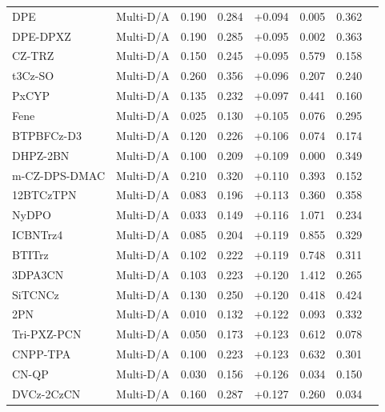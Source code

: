 \begin{longtable}{llcccccc}
DPE & Multi-D/A & 0.190 & 0.284 & +0.094 & 0.005 & 0.362 & \cite{doi101039C7TC02763J} \\
DPE-DPXZ & Multi-D/A & 0.190 & 0.285 & +0.095 & 0.002 & 0.363 & \cite{doi101039C7TC02763J} \\
CZ-TRZ & Multi-D/A & 0.150 & 0.245 & +0.095 & 0.579 & 0.158 & \cite{doi101016jorgel2020105783} \\
t3Cz-SO & Multi-D/A & 0.260 & 0.356 & +0.096 & 0.207 & 0.240 & \cite{doi101016jtet2020131869} \\
PxCYP & Multi-D/A & 0.135 & 0.232 & +0.097 & 0.441 & 0.160 & \cite{doi101016jdyepig2019107849} \\
Fene & Multi-D/A & 0.025 & 0.130 & +0.105 & 0.076 & 0.295 & \cite{doi101016jcclet202007041} \\
BTPBFCz-D3 & Multi-D/A & 0.120 & 0.226 & +0.106 & 0.074 & 0.174 & \cite{doi101016jcej2020127293} \\
DHPZ-2BN & Multi-D/A & 0.100 & 0.209 & +0.109 & 0.000 & 0.349 & \cite{doi101039C4TC02530J} \\
m-CZ-DPS-DMAC & Multi-D/A & 0.210 & 0.320 & +0.110 & 0.393 & 0.152 & \cite{doi101016jsaa2023122344} \\
12BTCzTPN & Multi-D/A & 0.083 & 0.196 & +0.113 & 0.360 & 0.358 & \cite{doi101016jcej2022137181} \\
NyDPO & Multi-D/A & 0.033 & 0.149 & +0.116 & 1.071 & 0.234 & \cite{doi101039D0TC01644F} \\
ICBNTrz4 & Multi-D/A & 0.085 & 0.204 & +0.119 & 0.855 & 0.329 & \cite{doi101016jcej2021130988} \\
BTITrz & Multi-D/A & 0.102 & 0.222 & +0.119 & 0.748 & 0.311 & \cite{doi101039C9TC04679H} \\
3DPA3CN & Multi-D/A & 0.103 & 0.223 & +0.120 & 1.412 & 0.265 & \cite{doi101039C5CC00511F} \\
SiTCNCz & Multi-D/A & 0.130 & 0.250 & +0.120 & 0.418 & 0.424 & \cite{doi101039D1TC03225A} \\
2PN & Multi-D/A & 0.010 & 0.132 & +0.122 & 0.093 & 0.332 & \cite{doi101016jjlumin2021118683} \\
Tri-PXZ-PCN & Multi-D/A & 0.050 & 0.173 & +0.123 & 0.612 & 0.078 & \cite{doi101039C8TC01698D} \\
CNPP-TPA & Multi-D/A & 0.100 & 0.223 & +0.123 & 0.632 & 0.301 & \cite{doi101016jcej2022135080} \\
CN-QP & Multi-D/A & 0.030 & 0.156 & +0.126 & 0.034 & 0.150 & \cite{doi101039C9NJ03184G} \\
DVCz-2CzCN & Multi-D/A & 0.160 & 0.287 & +0.127 & 0.260 & 0.034 & \cite{doi101016jorgel2022106442} \\

\end{longtable}
